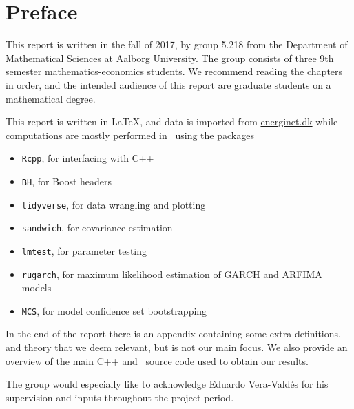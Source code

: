 \chapter{Preface} \label{ch:preface}
This report is written in the fall of 2017, by group 5.218 from the Department of Mathematical Sciences at Aalborg University. The group consists of three 9th semester mathematics-economics students. 
We recommend reading the chapters in order, and the intended audience of this report are graduate students on a mathematical degree.

This report is written in \LaTeX, and data is imported from \url{energinet.dk} while computations are mostly performed in \Rlang ~using the packages

\begin{itemize}
	\item \texttt{Rcpp}, for interfacing with C++
	\item \texttt{BH}, for Boost headers
	\item \texttt{tidyverse}, for data wrangling and plotting
	\item \texttt{sandwich}, for covariance estimation
	\item \texttt{lmtest}, for parameter testing
	\item \texttt{rugarch}, for maximum likelihood estimation of GARCH and ARFIMA models
	\item \texttt{MCS}, for model confidence set bootstrapping
\end{itemize}

In the end of the report there is an appendix containing some extra definitions, and theory that we deem relevant, but is not our main focus.
We also provide an overview of the main C++ and \Rlang ~source code used to obtain our results.

The group would especially like to acknowledge Eduardo Vera-Valdés for his supervision and inputs throughout the project period. 


%
%
\vfill
%

